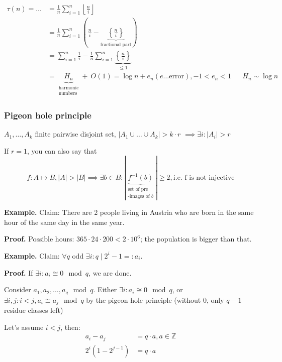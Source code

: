 \begin{align*}
  \tau(n) = … &=
    \frac{1}{n} \sum_{i=1}^n \left\lfloor\frac{n}{i}\right\rfloor \\
    &= \frac{1}{n} \sum_{i=1}^n \left(\frac{n}{i} - \underbrace{\left\{ \frac ni \right\}}_{\text{fractional part}}\right) \\
    &= \sum_{i=1}^n \frac1i -
        \frac1n\sum_{i=1}^n
            \underbrace{\left\{ \frac ni \right\} }_{≤ 1} \\
    &=  \underbrace{H_n}_{\begin{matrix}\text{harmonic} \\ \text{numbers}\end{matrix}} + ~O(1) =
        \log n + e_n (e … \text{error}), -1 < e_n < 1 && H_n\sim \log n
\end{align*}


\subsubsection{Pigeon hole principle}

$A_1, \ldots , A_k$ finite pairwise disjoint set,
$|A_1 \cup \ldots \cup A_k| > k\cdot r$
$\implies \exists i : |A_i| > r$

If $r=1$, you can also say that
\[
  f: A\mapsto B, |A| > |B| \implies \exists b \in B :
  |\underbrace{f^{-1}(b)}_{\begin{matrix}\text{set of pre} \\ \text{-images of $b$}\end{matrix}}|
    ≥ 2 ,
    \text{i.e. f is not injective}
\]


\textbf{Example.}
Claim: There are 2 people living in Austria who are born in the same hour of the same day in the same year.

\textbf{Proof.}
Possible hours: $365\cdot 24\cdot 200 < 2\cdot 10^6$;
the population is bigger than that.


\textbf{Example.}
Claim: $\forall q\text{ odd } \exists i: q \mid 2^i-1 =: a_i$.

\textbf{Proof.}
If $\exists i: a_i \cong 0 \mod q$, we are done.

Consider $a_1, a_2,\ldots, a_q \mod q$.
Either $\exists i: a_i \cong 0 \mod q$,
or $\exists i,j: i < j, a_i \cong a_j \mod q$
by the pigeon hole principle (without 0, only $q-1$ residue classes left)

Let's assume $i < j$, then:
\begin{align*}
  a_i - a_j &= q\cdot a, a\in\mathbb{Z} \\
  2^i(1 - 2^{j-1}) &= q\cdot a
\end{align*}

